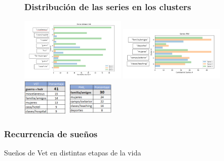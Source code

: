 \documentclass{beamer}
\begin{document}
\begin{frame}
\begin{figure}[h]
\frametitle{Distribución de las series en los clusters}
\begin{center}
  \includegraphics[width=0.45\textwidth, keepaspectratio]{we/vet_series_bars.PNG}
  \includegraphics[width=0.45\textwidth, keepaspectratio]{we/phil_series_bars.PNG}
  \includegraphics[width=0.2\textwidth]{we/vet_resumen.PNG}
  \hspace{5em}
  \includegraphics[width=0.2\textwidth]{we/phil_resumen.PNG}
\end{center}
\end{figure}
\end{frame}

\begin{frame}
\frametitle{Recurrencia de sueños}
Sueños de Vet en distintas etapas de la vida
\end{frame}
\end{document}

